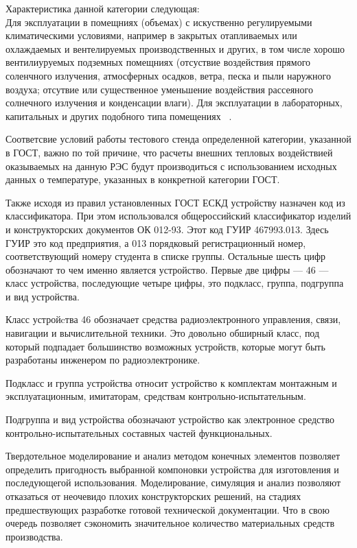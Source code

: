 Характеристика данной категории следующая:\\
Для эксплуатации в помещниях (объемах) с искуственно регулируемыми
климатическими условиями, например в закрытых отапливаемых или
охлаждаемых и вентелируемых производственных и других, в том числе
хорошо вентилиуруемых подземных помещниях (отсуствие воздействия
прямого соленчного излучения, атмосферных осадков, ветра, песка и пыли
наружного воздуха; отсутвие или существенное уменьшение воздействия
рассеяного солнечного излучения и конденсации влаги). Для эксплуатации
в лабораторных, капитальных и других подобного типа помещениях ~\cite{GOST-15150-69}.

Соответсвие условий работы тестового стенда определенной категории,
указанной в ГОСТ, важно по той причине,
что расчеты внешних тепловых воздействией оказываемых на данную РЭС будут производиться с использованием исходных данных о температуре,
указанных в конкретной категории ГОСТ.


Также исходя из правил установленных ГОСТ ЕСКД устройству назначен код из классификатора.
При этом использовался общероссийский классификатор изделий и конструкторских документов ОК 012-93.
Этот код ГУИР 467993.013. Здесь ГУИР это код предприятия, а 013 порядковый регистрационный номер,
соответствующий номеру студента в списке группы.
Остальные шесть цифр обозначают то чем именно является устройство.
Первые две цифры — 46 — класс устройства, последующие четыре цифры,
это подкласс, группа, подгруппа и вид устройства.

Класс устройcтва 46 обозначает средства радиоэлектронного управления, связи, навигации и вычислительной техники.
Это довольно обширный класс, под который подпадает большинство возможных устройств,
которые могут быть разработаны инженером по радиоэлектронике.

Подкласс и группа устройства относит устройство к комплектам монтажным и эксплуатационным,
имитаторам, средствам контрольно-испытательным.

Подгруппа и вид устройства обозначают устройство как электронное средство контрольно-испытательных составных частей функциональных.

Твердотельное моделирование и анализ методом конечных элементов
позволяет определить пригодность выбранной компоновки устройства для
изготовления и последующегой использования.
Моделирование, симуляция и анализ позволяют отказаться от неочевидо плохих конструкторских решений,
на стадиях предшествующих разработке готовой технической документации.
Что в свою очередь позволяет сэкономить значительное количество материальных средств производства.

